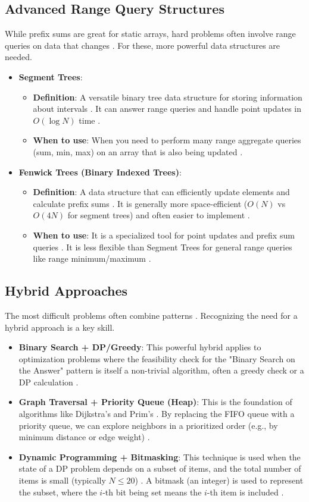 \documentclass{article}
\begin{document}
\subsection{Advanced Range Query Structures}
While prefix sums are great for static arrays, hard problems often involve range queries on data that changes \cite{1089, 1090}. For these, more powerful data structures are needed.
\begin{itemize}
\item \textbf{Segment Trees}:
\begin{itemize}
\item \textbf{Definition}: A versatile binary tree data structure for storing information about intervals \cite{1092, 1093}. It can answer range queries and handle point updates in $O(\log N)$ time \cite{1094}.
\item \textbf{When to use}: When you need to perform many range aggregate queries (sum, min, max) on an array that is also being updated \cite{1098}.
\end{itemize}
\item \textbf{Fenwick Trees (Binary Indexed Trees)}:
\begin{itemize}
\item \textbf{Definition}: A data structure that can efficiently update elements and calculate prefix sums \cite{1103}. It is generally more space-efficient ($O(N)$ vs $O(4N)$ for segment trees) and often easier to implement \cite{1104}.
\item \textbf{When to use}: It is a specialized tool for point updates and prefix sum queries \cite{1107}. It is less flexible than Segment Trees for general range queries like range minimum/maximum \cite{1108}.
\end{itemize}
\end{itemize}

\subsection{Hybrid Approaches}
The most difficult problems often combine patterns \cite{1111}. Recognizing the need for a hybrid approach is a key skill.
\begin{itemize}
\item \textbf{Binary Search + DP/Greedy}: This powerful hybrid applies to optimization problems where the feasibility check for the "Binary Search on the Answer" pattern is itself a non-trivial algorithm, often a greedy check or a DP calculation \cite{1114, 1115}.
\item \textbf{Graph Traversal + Priority Queue (Heap)}: This is the foundation of algorithms like Dijkstra's and Prim's \cite{1120}. By replacing the FIFO queue with a priority queue, we can explore neighbors in a prioritized order (e.g., by minimum distance or edge weight) \cite{1121, 1122}.
\item \textbf{Dynamic Programming + Bitmasking}: This technique is used when the state of a DP problem depends on a subset of items, and the total number of items is small (typically $N\le20$) \cite{1126}. A bitmask (an integer) is used to represent the subset, where the $i$-th bit being set means the $i$-th item is included \cite{1127, 1128}.
\end{itemize}
\end{document}

